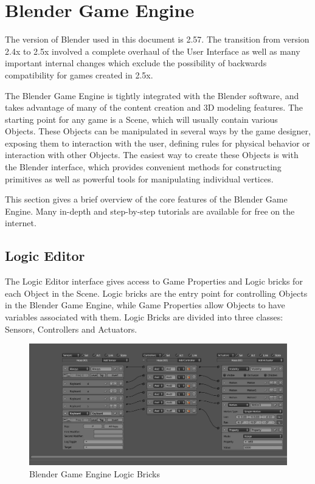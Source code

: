 \section{Blender Game Engine}

The version of Blender used in this document is 2.57. The transition from
version 2.4x to 2.5x involved a complete overhaul of the User Interface as well
as many important internal changes which exclude the possibility of backwards
compatibility for games created in 2.5x.


The Blender Game Engine is tightly integrated with the Blender software, and
takes advantage of many of the content creation and 3D modeling features. The
starting point for any game is a Scene, which will usually contain various
Objects. These Objects can be manipulated in several ways by the game designer,
exposing them to interaction with the user, defining rules for physical
behavior or interaction with other Objects. The easiest way to create these
Objects is with the Blender interface, which provides convenient methods for
constructing primitives as well as powerful tools for manipulating individual
vertices.


This section gives a brief overview of the core features of the Blender Game
Engine. Many in-depth and step-by-step tutorials are available for
free on the internet.


\subsection{Logic Editor}

The Logic Editor interface gives access to Game Properties and Logic bricks for
each Object in the Scene.  Logic bricks are the entry point for controlling
Objects in the Blender Game Engine, while Game Properties allow Objects to have
variables associated with them. Logic Bricks are divided into three classes:
Sensors, Controllers and Actuators.

\begin{figure}[!htc]
\centering
\includegraphics[scale=0.35]{figures/ui_logic.png}
\caption{ Blender Game Engine Logic Bricks }
\label{fig:logic}
\end{figure}


